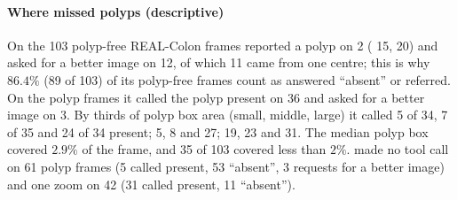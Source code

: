 \paragraph{Where \ms{} missed polyps (descriptive)} On the 103 polyp-free REAL-Colon frames \ms{} reported a polyp on 2 (\base{} 15, \opus{} 20) and asked for a better image on 12, of which 11 came from one centre; this is why $86.4\%$ (89 of 103) of its polyp-free frames count as answered ``absent'' or referred. On the polyp frames it called the polyp present on 36 and asked for a better image on 3. By thirds of polyp box area (small, middle, large) it called 5 of 34, 7 of 35 and 24 of 34 present; \base{} 5, 8 and 27; \opus{} 19, 23 and 31. The median polyp box covered $2.9\%$ of the frame, and 35 of 103 covered less than $2\%$. \ms{} made no tool call on 61 polyp frames (5 called present, 53 ``absent'', 3 requests for a better image) and one zoom on 42 (31 called present, 11 ``absent'').

